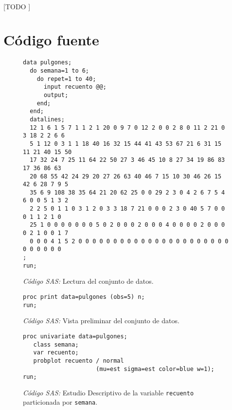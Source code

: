 \documentclass[11pt]{article}
\begin{document}
      \paragraph{}
      [TODO ]

  \section{Código fuente}
  \label{sec:code}

    \begin{figure}[!h]
      \centering
      \begin{verbatim}
data pulgones;
  do semana=1 to 6;
    do repet=1 to 40;
      input recuento @@;
      output;
    end;
  end;
  datalines;
  12 1 6 1 5 7 1 1 2 1 20 0 9 7 0 12 2 0 0 2 8 0 11 2 21 0 3 18 2 2 6 6
  5 1 12 0 3 1 1 18 40 16 32 15 44 41 43 53 67 21 6 31 15 11 21 40 15 50
  17 32 24 7 25 11 64 22 50 27 3 46 45 10 8 27 34 19 86 83 17 36 86 63
  20 68 55 42 24 29 20 27 26 63 40 46 7 15 10 30 46 26 15 42 6 28 7 9 5
  35 6 9 108 38 35 64 21 20 62 25 0 0 29 2 3 0 4 2 6 7 5 4 6 0 0 5 1 3 2
  2 2 5 0 1 1 0 3 1 2 0 3 3 18 7 21 0 0 0 2 3 0 40 5 7 0 0 0 1 1 2 1 0
  25 1 0 0 0 0 0 0 0 5 0 2 0 0 0 2 0 0 0 4 0 0 0 0 2 0 0 0 0 2 1 0 0 1 7
  0 0 0 4 1 5 2 0 0 0 0 0 0 0 0 0 0 0 0 0 0 0 0 0 0 0 0 0 0 0 0 0 0 0 0
;
run;
      \end{verbatim}
      \caption{\emph{Código SAS:} Lectura del conjunto de datos.}
      \label{code:sas_1}
    \end{figure}


    \begin{figure}[!h]
      \centering
      \begin{verbatim}
proc print data=pulgones (obs=5) n;
run;
      \end{verbatim}
      \caption{\emph{Código SAS:} Vista preliminar del conjunto de datos.}
      \label{code:sas_2}
    \end{figure}

    \begin{figure}[!h]
      \centering
      \begin{verbatim}
proc univariate data=pulgones;
   class semana;
   var recuento;
   probplot recuento / normal
                     (mu=est sigma=est color=blue w=1);
run;
      \end{verbatim}
      \caption{\emph{Código SAS:} Estudio Descriptivo de la variable \texttt{recuento} particionada por \texttt{semana}.}
      \label{code:sas_3}
    \end{figure}
\end{document}
